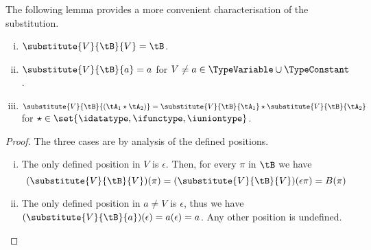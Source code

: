 The following lemma provides a more convenient characterisation of the
substitution.

\begin{lemma}
\label{lem:treeSubstitution}
\begin{enumerate}[(i)]
  \item $\substitute{V}{\tB}{V} = \tB$.
  \item $\substitute{V}{\tB}{a} = a$ for $V \neq a \in \TypeVariable \cup
  \TypeConstant$.
  \item $\substitute{V}{\tB}{(\tA_1 \star \tA_2)} = \substitute{V}{\tB}{\tA_1}
  \star \substitute{V}{\tB}{\tA_2}$ for $\star \in \set{\idatatype, \ifunctype,
  \iuniontype}$.
\end{enumerate}
\end{lemma}

\begin{proof}
The three cases are by analysis of the defined positions.
\begin{enumerate}[(i)]
  \item The only defined position in $V$ is $\epsilon$. Then, for every $\pi$
  in $\tB$ we have $$(\substitute{V}{\tB}{V})(\pi) =
  (\substitute{V}{\tB}{V})(\epsilon\pi) = B(\pi)$$
  
  \item The only defined position in $a \neq V$ is $\epsilon$, thus we have
  $(\substitute{V}{\tB}{a})(\epsilon) = a(\epsilon) = a$. Any other position is
  undefined.
  

\end{enumerate}
\end{proof}
